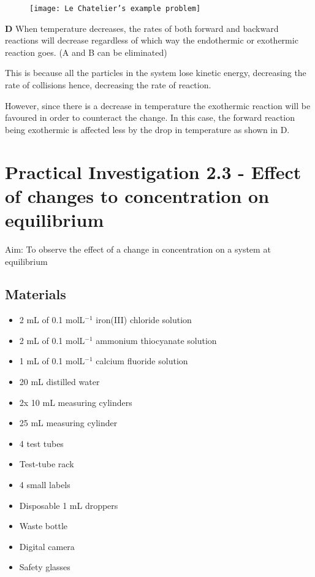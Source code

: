 	\begin{figure}[H]
		\centering
		\texttt{[image: Le Chatelier's example problem]}
	\end{figure}

	\textbf{D} When temperature decreases, the rates of both forward and backward reactions will decrease regardless of which way the endothermic or exothermic reaction goes. (A and B can be eliminated)

	This is because all the particles in the system lose kinetic energy, decreasing the rate of collisions hence, decreasing the rate of reaction.
	
	However, since there is a decrease in temperature the exothermic reaction will be favoured in order to counteract the change. In this case, the forward reaction being exothermic is affected less by the drop in temperature as shown in D.

\pagebreak
\section{Practical Investigation 2.3 - Effect of changes to concentration on equilibrium} \label{31/10/2024}

	Aim: To observe the effect of a change in concentration on a system at equilibrium

	\subsection{Materials}
		\begin{itemize}
			\item 2 mL of 0.1 molL$^{-1}$ iron(III) chloride solution
			\item 2 mL of 0.1 molL$^{-1}$ ammonium thiocyanate solution
			\item 1 mL of 0.1 molL$^{-1}$ calcium fluoride solution
			\item 20 mL distilled water
			\item 2x 10 mL measuring cylinders
			\item 25 mL measuring cylinder
			\item 4 test tubes
			\item Test-tube rack
			\item 4 small labels
			\item Disposable 1 mL droppers
			\item Waste bottle
			\item Digital camera
			\item Safety glasses
		\end{itemize}

